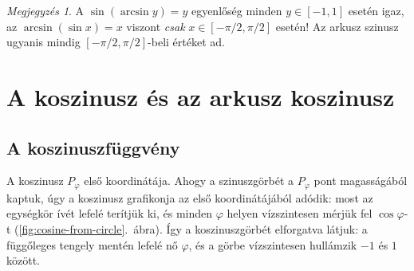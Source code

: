 \documentclass[11pt]{scrartcl}
\theoremstyle{definition}
\newtheorem{example}[definition]{Példa}
\theoremstyle{remark}
\newtheorem*{remark}{Megjegyzés}
\begin{document}
\begin{remark}
	A $\sin(\arcsin y) = y$ egyenlőség minden $y \in [-1, 1]$ esetén igaz, az
	$\arcsin(\sin x) = x$ viszont \emph{csak}
	$x \in \left[-\pi / 2, \pi / 2\right]$ esetén! Az arkusz szinusz ugyanis
	mindig $\left[-\pi / 2, \pi / 2\right]$-beli értéket ad.
\end{remark}

%

%

\section{A koszinusz és az arkusz koszinusz}

\subsection{A koszinuszfüggvény}

A koszinusz $P_\varphi$ első koordinátája. Ahogy a szinuszgörbét a $P_\varphi$
pont magasságából kaptuk, úgy a koszinusz grafikonja az első koordinátájából
adódik: most az egységkör ívét lefelé terítjük ki, és minden $\varphi$ helyen
vízszintesen mérjük fel $\cos\varphi$-t (\ref{fig:cosine-from-circle}.~ábra). Így
a koszinuszgörbét elforgatva látjuk: a függőleges tengely mentén lefelé nő
$\varphi$, és a görbe vízszintesen hullámzik $-1$ és $1$ között.
\end{document}
